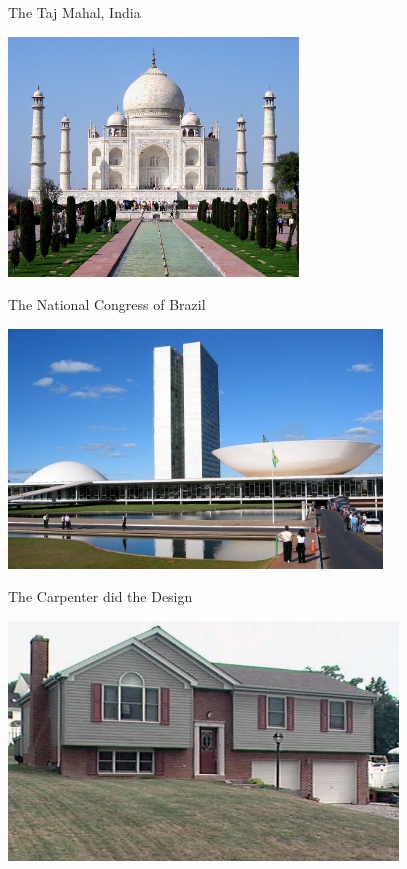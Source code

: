 \begin{frame}[fragile]{The Taj Mahal, India}
\begin{center}
  \includegraphics[height=180pt]{TajMahal.jpg}
\end{center}
\end{frame}

\begin{frame}[fragile]{The National Congress of Brazil}
\begin{center}
  \includegraphics[height=180pt]{CongressoDoBrasil.jpg}
\end{center}
\end{frame}

\begin{frame}[fragile]{The Carpenter did the Design}
\begin{center}
  \includegraphics[height=180pt]{badbuilding2.jpg}
\end{center}
\end{frame}

